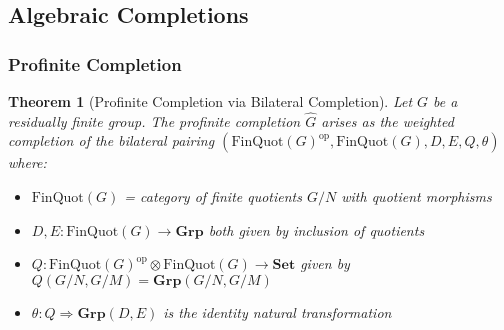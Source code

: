 \documentclass[11pt]{article}
\theoremstyle{plain}
\newtheorem{theorem}{Theorem}[section]
\theoremstyle{definition}
\theoremstyle{remark}
\newcommand{\op}{\mathrm{op}}
\begin{document}
\subsection{Algebraic Completions}

\subsubsection{Profinite Completion}

\begin{theorem}[Profinite Completion via Bilateral Completion]\label{thm:profinite-bilateral}
Let $G$ be a residually finite group. The profinite completion $\widehat{G}$ arises as the weighted completion of the bilateral pairing $(\mathrm{FinQuot}(G)^{\op}, \mathrm{FinQuot}(G), D, E, Q, \theta)$ where:
\begin{itemize}
\item $\mathrm{FinQuot}(G)$ = category of finite quotients $G/N$ with quotient morphisms
\item $D, E : \mathrm{FinQuot}(G) \to \mathbf{Grp}$ both given by inclusion of quotients
\item $Q : \mathrm{FinQuot}(G)^{\op} \otimes \mathrm{FinQuot}(G) \to \mathbf{Set}$ given by $Q(G/N, G/M) = \mathbf{Grp}(G/N, G/M)$
\item $\theta : Q \Rightarrow \mathbf{Grp}(D, E)$ is the identity natural transformation
\end{itemize}
\end{theorem}
\end{document}
